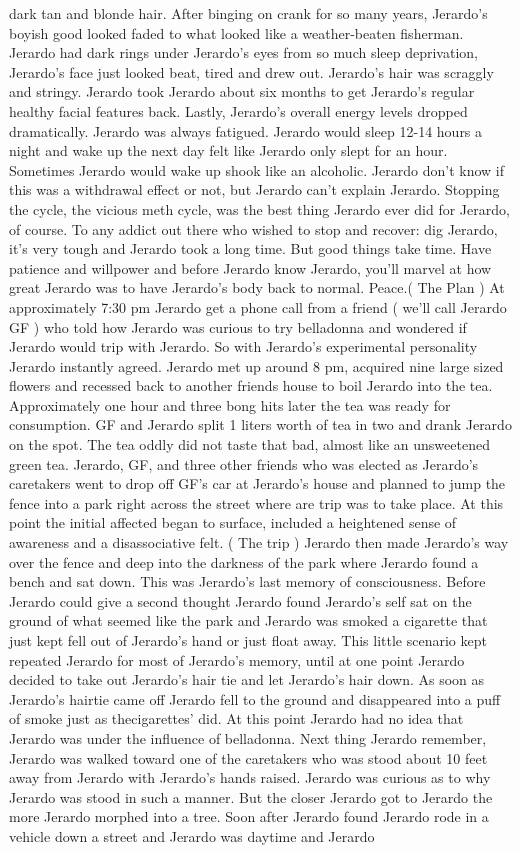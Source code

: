 \documentclass[12pt]{book}
\begin{document}
dark tan and blonde hair. After binging on crank for so many years, Jerardo's boyish good looked faded to what looked like a weather-beaten fisherman. Jerardo had dark rings under Jerardo's eyes from so much sleep deprivation, Jerardo's face just looked beat, tired and drew out. Jerardo's hair was scraggly and stringy. Jerardo took Jerardo about six months to get Jerardo's regular healthy facial features back. Lastly, Jerardo's overall energy levels dropped dramatically. Jerardo was always fatigued. Jerardo would sleep 12-14 hours a night and wake up the next day felt like Jerardo only slept for an hour. Sometimes Jerardo would wake up shook like an alcoholic. Jerardo don't know if this was a withdrawal effect or not, but Jerardo can't explain Jerardo. Stopping the cycle, the vicious meth cycle, was the best thing Jerardo ever did for Jerardo, of course. To any addict out there who wished to stop and recover: dig Jerardo, it's very tough and Jerardo took a long time. But good things take time. Have patience and willpower and before Jerardo know Jerardo, you'll marvel at how great Jerardo was to have Jerardo's body back to normal. Peace.( The Plan ) At approximately 7:30 pm Jerardo get a phone call from a friend ( we'll call Jerardo GF ) who told how Jerardo was curious to try belladonna and wondered if Jerardo would trip with Jerardo. So with Jerardo's experimental personality Jerardo instantly agreed. Jerardo met up around 8 pm, acquired nine large sized flowers and recessed back to another friends house to boil Jerardo into the tea. Approximately one hour and three bong hits later the tea was ready for consumption. GF and Jerardo split 1 liters worth of tea in two and drank Jerardo on the spot. The tea oddly did not taste that bad, almost like an unsweetened green tea. Jerardo, GF, and three other friends who was elected as Jerardo's caretakers went to drop off GF's car at Jerardo's house and planned to jump the fence into a park right across the street where are trip was to take place. At this point the initial affected began to surface, included a heightened sense of awareness and a disassociative felt. ( The trip ) Jerardo then made Jerardo's way over the fence and deep into the darkness of the park where Jerardo found a bench and sat down. This was Jerardo's last memory of consciousness. Before Jerardo could give a second thought Jerardo found Jerardo's self sat on the ground of what seemed like the park and Jerardo was smoked a cigarette that just kept fell out of Jerardo's hand or just float away. This little scenario kept repeated Jerardo for most of Jerardo's memory, until at one point Jerardo decided to take out Jerardo's hair tie and let Jerardo's hair down. As soon as Jerardo's hairtie came off Jerardo fell to the ground and disappeared into a puff of smoke just as thecigarettes' did. At this point Jerardo had no idea that Jerardo was under the influence of belladonna. Next thing Jerardo remember, Jerardo was walked toward one of the caretakers who was stood about 10 feet away from Jerardo with Jerardo's hands raised. Jerardo was curious as to why Jerardo was stood in such a manner. But the closer Jerardo got to Jerardo the more Jerardo morphed into a tree. Soon after Jerardo found Jerardo rode in a vehicle down a street and Jerardo was daytime and Jerardo 
\end{document}
